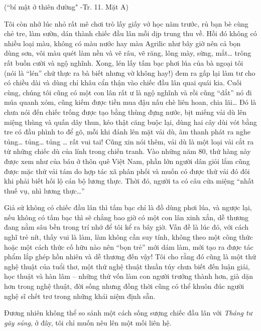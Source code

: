 \documentclass[../main.tex]{subfiles}
\begin{document}
\begin{multicols}{2}
\begin{blockquote}
(“bí mật ở thiên đường" -Tr. 11. Mặt A) 

\end{blockquote}
 
Tôi còn nhớ lúc nhỏ rất mê chơi trò lấy giấy vở học năm trước, rủ bạn bè cùng chẻ tre, làm sườn, dán thành chiếc đầu lân mỗi dịp trung thu về. Hồi đó không có nhiều loại màu, không có màu nước hay màu Agrilic như bây giờ nên cả bọn dùng sơn, vôi màu quét làm nền và vẽ râu, vẽ răng, lông mày, sừng, mắt… trông rất buồn cười và ngộ nghĩnh. Xong, lén lấy tấm bạc phơi lúa của bà ngoại tôi (nói là “lén” chứ thực ra bà biết nhưng vờ không hay!) đem ra gấp lại làm tư cho có chiều dài và dùng chỉ khâu cẩn thận vào chiếc đầu lân quai quái kia. Cuối cùng, chúng tôi cũng có một con lân rất ư là ngộ nghĩnh và rồi cũng “dắt” nó đi múa quanh xóm, cũng kiếm được tiền mua đậu nấu chè liên hoan, chia lãi… Đó là chưa nói đến chiếc trống được tạo bằng thùng đựng nước, bịt miếng vải dù lên miệng thùng và quấn dây thun, kéo thật căng buộc lại, dùng hai cây dùi vót bằng tre có đầu phình to để gõ, mỗi khi đánh lên mặt vải dù, âm thanh phát ra nghe tủng… tủng… tủng … rất vui tai! Cũng xin nói thêm, vải dù  là một loại vải cắt ra từ những chiếc dù của lính trong chiến tranh. Vào những năm 80, thứ hàng này được xem như của báu ở thôn quê Việt Nam, phần lớn người dân giỏi lắm cũng được mặc thứ vải tám do hợp tác xã phân phối và muốn có được thứ vải đó đôi khi phải biết hối lộ cán bộ lương thực. Thời đó, người ta có câu cửa miệng “nhất thuế vụ, nhì lương thực…” 
 
Giả sử không có chiếc đầu lân thì tấm bạc chỉ là đồ dùng phơi lúa, và ngược lại, nếu không có tấm bạc thì sẽ chẳng bao giờ có một con lân xinh xắn, dễ thương đang nằm sâu bền trong trí nhớ để tôi kể ra bây giờ. Vấn đề là lúc đó, với cách nghĩ trẻ nít, thấy vui là làm, làm không cần suy tính, không theo một công thức hoặc một cách thức cố hữu nào nên “bọn trẻ” mới dám làm, mới tạo ra được tác phẩm lắp ghép hồn nhiên và dễ thương đến vậy! Tôi cho rằng đó cũng là một thứ nghệ thuật của tuổi thơ, một thứ nghệ thuật thuần túy chưa biết đến luận giải, học thuật và hàn lâm – những thứ vốn làm con người trưởng thành hơn, già dặn hơn trong nghệ thuật, đời sống nhưng đồng thời cũng có thể khuôn đúc người nghệ sĩ chết trơ trong những khái niệm định sẵn.  
 
Đương nhiên không thể so sánh một cách sống sượng chiếc đầu lân với \textit{Tháng tư gãy súng}, ở đây, tôi chỉ muốn nêu lên một mối liên hệ. 
\begin{blockquote}
 

\end{blockquote}
\end{multicols}
\end{document}
